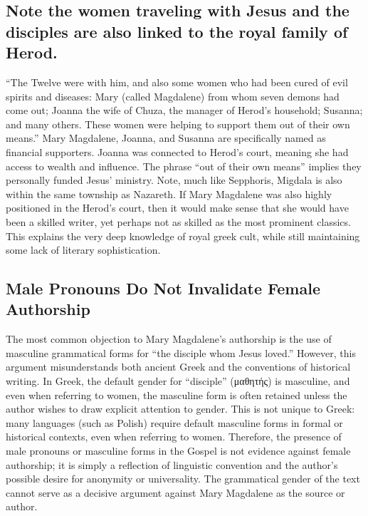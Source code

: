 \subsection{Note the women traveling with Jesus and the disciples are also linked to the royal family of Herod.}\label{subsec:note-the-women-traveling-with-jesus-and-the-disciples-are-also-linked-to-the-royal-family-of-herod.}

``The Twelve were with him, and also some women who had been cured of evil spirits and diseases: Mary (called Magdalene) from whom seven demons had come out; Joanna the wife of Chuza, the manager of Herod's household; Susanna; and many others.
These women were helping to support them out of their own means.'' Mary Magdalene, Joanna, and Susanna are specifically named as financial supporters.
Joanna was connected to Herod's court, meaning she had access to wealth and influence.
The phrase ``out of their own means'' implies they personally funded Jesus' ministry.
Note, much like Sepphoris, Migdala is also within the same township as Nazareth.
If Mary Magdalene was also highly positioned in the Herod's court, then it would make sense that she would have been a skilled writer, yet perhaps not as skilled as the most prominent classics.
This explains the very deep knowledge of royal greek cult, while still maintaining some lack of literary sophistication.

\subsection{Male Pronouns Do Not Invalidate Female Authorship}\label{subsec:the-authorship-of-mary-is-typically-dismissed-as-a-possibility-because-of-the-use-of-male-pronouns-in-the-gospel.}

The most common objection to Mary Magdalene’s authorship is the use of masculine grammatical forms for “the disciple whom Jesus loved.” However, this argument misunderstands both ancient Greek and the conventions of historical writing. In Greek, the default gender for “disciple” (μαθητής) is masculine, and even when referring to women, the masculine form is often retained unless the author wishes to draw explicit attention to gender. This is not unique to Greek: many languages (such as Polish) require default masculine forms in formal or historical contexts, even when referring to women. Therefore, the presence of male pronouns or masculine forms in the Gospel is not evidence against female authorship; it is simply a reflection of linguistic convention and the author’s possible desire for anonymity or universality. The grammatical gender of the text cannot serve as a decisive argument against Mary Magdalene as the source or author.

